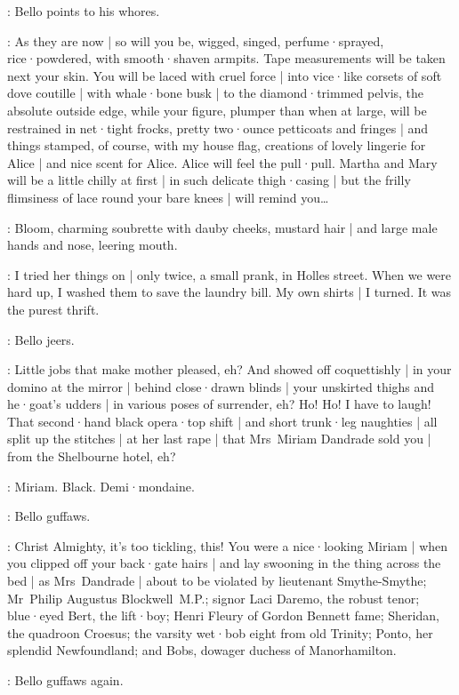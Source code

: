 :
Bello points to his whores.

\Bello:
As they are now |
so will you be,
wigged,
singed,
perfume·sprayed,
rice·powdered,
with smooth·shaven armpits.
Tape measurements will be taken next your skin.
You will be laced with cruel force |
into vice·like corsets of soft dove coutille |
with whale·bone busk |
to the diamond·trimmed pelvis,
the absolute outside edge,
while your figure,
plumper than when at large,
will be restrained in net·tight frocks,
pretty two·ounce petticoats and fringes |
and things stamped,
of course,
with my house flag,
%
creations of lovely lingerie for Alice |
and nice scent for Alice.
Alice will feel the pull·pull.
Martha and Mary will be a little chilly at first |
in such delicate thigh·casing |
but the frilly flimsiness of lace round your bare knees |
will remind you…

:
Bloom,
charming soubrette with dauby cheeks,
mustard hair |
and large male hands and nose,
leering mouth.

\Bloom:
I tried her things on |
only twice,
a small prank,
in Holles street.
When we were hard up,
I washed them to save the laundry bill.
My own shirts |
I turned.
It was the purest thrift.

:
Bello jeers.

\Bello:
Little jobs that make mother pleased,
eh?
%
And showed off coquettishly |
in your domino at the mirror |
behind close·drawn blinds |
your unskirted thighs and he·goat's udders |
in various poses of surrender,
eh?
Ho!
Ho!
I have to laugh!
That second·hand black opera·top shift |
and short trunk·leg naughties |
all split up the stitches |
at her last rape |
that Mrs~Miriam Dandrade sold you |
from the Shelbourne hotel,
eh?

\Bloom:
Miriam.
Black.
Demi·mondaine.

:
Bello guffaws.

\Bello:
Christ Almighty,
it's too tickling,
this!
You were a nice·looking Miriam |
when you clipped off your back·gate hairs |
%
and lay swooning in the thing across the bed |
as Mrs~Dandrade |
about to be violated by lieutenant Smythe-Smythe;
Mr~Philip Augustus Blockwell~M.P.;
signor Laci Daremo,
the robust tenor;
blue·eyed Bert,
the lift·boy;
Henri Fleury of Gordon Bennett fame;
Sheridan,
the quadroon Croesus;
the varsity wet·bob eight from old Trinity;
Ponto,
her splendid Newfoundland;
and Bobs,
dowager duchess of Manorhamilton.

:
Bello guffaws again.

